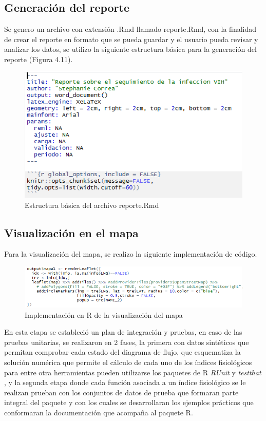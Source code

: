 \subsection{Generaci\'on del reporte}

Se genero un archivo con extensi\'on .Rmd llamado reporte.Rmd, con la finalidad de crear el reporte en formato que se pueda guardar y el usuario pueda revisar y analizar los datos, se utilizo la siguiente estructura b\'asica para la generaci\'on del reporte (Figura 4.11).

\begin{figure}[H]
\centering
\includegraphics[scale=0.8]{reporte.PNG}
\caption{Estructura b\'asica del archivo reporte.Rmd}
\end{figure}

\subsection{Visualizaci\'on en el mapa}

Para la visualizaci\'on del mapa, se realizo la siguiente implementaci\'on de c\'odigo.

\begin{figure}[H]
\centering
\includegraphics[scale=0.8]{mapa.PNG}
\caption{Implementaci\'on en R de la visualizaci\'on del mapa}
\end{figure}

 
En esta etapa se estableci\'o un plan de integraci\'on y pruebas, en caso de las pruebas unitarias, se realizaron en 2 fases, la primera con datos sint\'eticos que permitan comprobar cada estado del diagrama de flujo, que esquematiza la soluci\'on num\'erica que permite el c\'alculo de cada uno de los \'indices fisiol\'ogicos para entre otra herramientas pueden utilizarse los paquetes de R \emph{RUnit} \textit{\citet{runit}} y \emph{testthat} \citet{test}, y la segunda etapa donde cada funci\'on asociada a un \'indice fisiol\'ogico se le realizan prueban con los conjuntos de datos de prueba que formaran parte integral del paquete y con los cuales se desarrollaran los ejemplos pr\'acticos que conformaran la documentaci\'on que acompaña al paquete R.\\

